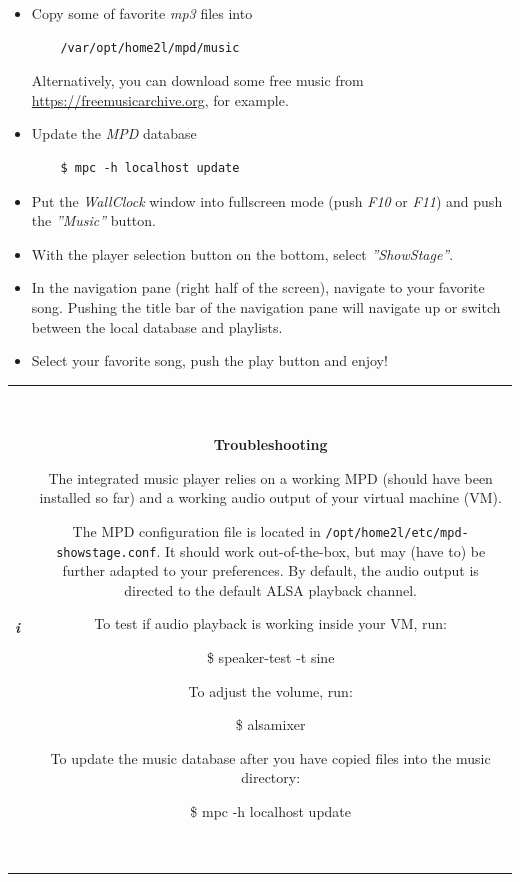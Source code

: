 \documentclass[12pt,english,parskip=half]{scrreprt}
\newcommand{\lstbox}[1]{
  \par
  \colorbox{lstbackground}{\ttfamily\footnotesize{\parbox{\linewidth}{#1}}}
  \par
}
\newcommand{\infobox}[1]{
  \hfill
  \setlength\arrayrulewidth{1pt}
  \begin{tabular}[t]{c|c|}
    \parbox{1.8em}{\hfill\textit{\Huge\textbf{i}\,}}
    &
    \,\parbox{0.89\linewidth}{\setlength{\parskip}{0.5em}#1}\,
  \end{tabular}
  \par
}
\begin{document}
\begin{itemize}[$\blacktriangleright$]
\item
  Copy some of favorite \emph{mp3} files into
  \begin{lstlisting}
    /var/opt/home2l/mpd/music
  \end{lstlisting}
  Alternatively, you can download some free music from \url{https://freemusicarchive.org},
  for example.

\item
  Update the \emph{MPD} database
  \begin{lstlisting}
    $ mpc -h localhost update
  \end{lstlisting}

\item
  Put the \emph{WallClock} window into fullscreen mode (push \emph{F10}
  or \emph{F11}) and push the \emph{''Music''} button.

\item
  With the player selection button on the bottom, select
  \emph{''ShowStage''}.

\item
  In the navigation pane (right half of the screen), navigate to your
  favorite song. Pushing the title bar of the navigation pane will
  navigate up or switch between the local database and playlists.

\item
  Select your favorite song, push the play button and enjoy!

\end{itemize}


\infobox{
  \textbf{Troubleshooting}

  The integrated music player relies on a working MPD (should have been installed so far)
  and a working audio output of your virtual machine (VM).

  The MPD configuration file is located in \texttt{/opt/home2l/etc/mpd-showstage.conf}. It
  should work out-of-the-box, but may (have to) be further adapted to your preferences.
  By default, the audio output is directed to the default ALSA playback channel.

  To test if audio playback is working inside your VM, run:
  \lstbox{
    \$ speaker-test -t sine
  }

  To adjust the volume, run:
  \lstbox{
    \$ alsamixer
  }

  To update the music database after you have copied files into the music directory:
  \lstbox{
    \$ mpc -h localhost update
  }
}
\end{document}
